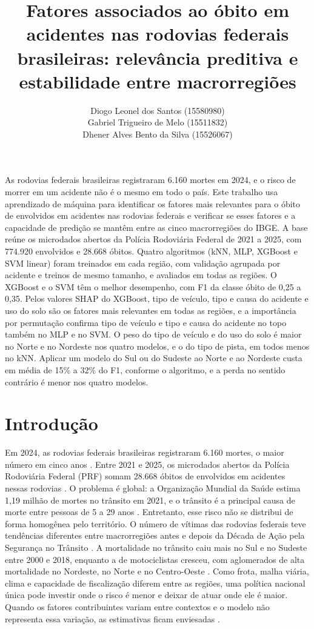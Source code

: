 \documentclass[12pt]{article}
\title{Fatores associados ao óbito em acidentes nas rodovias federais
  brasileiras: relevância preditiva e estabilidade entre macrorregiões}
\author{Diogo Leonel dos Santos (15580980)\\ Gabriel Trigueiro de Melo
  (15511832)\\ Dhener Alves Bento da Silva (15526067)}
\begin{document}
\maketitle

\begin{resumo}
As rodovias federais brasileiras registraram 6.160 mortes em 2024, e o
risco de morrer em um acidente não é o mesmo em todo o país. Este
trabalho usa aprendizado de máquina para identificar os fatores mais
relevantes para o óbito de envolvidos em acidentes nas rodovias federais
e verificar se esses fatores e a capacidade de predição se mantêm entre
as cinco macrorregiões do IBGE. A base reúne os microdados abertos da
Polícia Rodoviária Federal de 2021 a 2025, com 774.920 envolvidos e
28.668 óbitos. Quatro algoritmos (kNN, MLP, XGBoost e SVM linear) foram
treinados em cada região, com validação agrupada por acidente e treinos
de mesmo tamanho, e avaliados em todas as regiões. O XGBoost e o SVM têm
o melhor desempenho, com F1 da classe óbito de 0,25 a 0,35. Pelos
valores SHAP do XGBoost, tipo de veículo, tipo e causa do acidente e uso
do solo são os fatores mais relevantes em todas as regiões, e a
importância por permutação confirma tipo de veículo e tipo e causa do
acidente no topo também no MLP e no SVM. O peso do tipo de veículo e do
uso do solo é maior no Norte e no Nordeste nos quatro modelos, e o do
tipo de pista, em todos menos no kNN. Aplicar um modelo do Sul ou do Sudeste ao Norte e ao
Nordeste custa em média de 15\% a 32\% do F1, conforme o algoritmo, e a
perda no sentido contrário é menor nos quatro modelos.
\end{resumo}


\section{Introdução}

Em 2024, as rodovias federais brasileiras registraram 6.160 mortes, o
maior número em cinco anos \cite{prf2024}. Entre 2021 e 2025, os
microdados abertos da Polícia Rodoviária Federal (PRF) somam 28.668
óbitos de envolvidos em acidentes nessas rodovias \cite{prfdados}. O
problema é global: a Organização Mundial da Saúde estima 1,19
milhão de mortes no trânsito em 2021, e o trânsito é a principal causa
de morte entre pessoas de 5 a 29 anos \cite{oms2023}. Entretanto, esse
risco não se distribui de forma homogênea pelo território. O número de
vítimas das rodovias federais teve tendências diferentes entre
macrorregiões antes e depois da Década de Ação pela Segurança no
Trânsito \cite{andrade2019}. A mortalidade no trânsito caiu mais no Sul
e no Sudeste entre 2000 e 2018, enquanto a de motociclistas cresceu,
com aglomerados de alta mortalidade no Nordeste, no Norte e no
Centro-Oeste \cite{malta2023}. Como frota, malha viária, clima e
capacidade de fiscalização diferem entre as regiões, uma política
nacional única pode investir onde o risco é menor e deixar de atuar onde
ele é maior. Quando os fatores contribuintes variam entre contextos e o
modelo não representa essa variação, as estimativas ficam enviesadas
\cite{mannering2016}.
\end{document}
